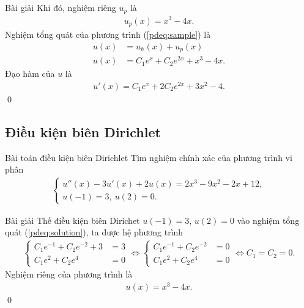 \documentclass[9pt]{beamer}
\numberwithin{equation}{section}
\begin{document}
\begin{frame}
\begin{exampleblock}{Bài giải}
     Khi đó, nghiệm riêng $u_p$ là
    \begin{align*}
        u_p(x) = x^3 - 4x.
    \end{align*}
    Nghiệm tổng quát của phương trình (\ref{pdeq:sample}) là
    \begin{align}
        u(x) &= u_h(x) + u_p(x) \nonumber \\
        u(x) &= C_1 e^x + C_2 e^{2x} + x^3 - 4x. \label{pdeq:solution}
    \end{align}
    Đạo hàm của $u$ là
    \begin{align}
        u'(x) = C_1 e^x + 2C_2 e^{2x} + 3x^2 - 4. \label{pdeq:deri}
    \end{align} \hfill \qed
\end{exampleblock}
\end{frame}

\subsection{Điều kiện biên Dirichlet}

\begin{frame}
\begin{block}{Bài toán điều kiện biên Dirichlet}
    Tìm nghiệm chính xác của phương trình vi phân
    \begin{align*}
        \begin{cases}
        u''(x) - 3u'(x) + 2u(x) = 2x^3 - 9x^2 - 2x + 12, \\
        u(-1) = 3, \ u(2) = 0.
        \end{cases}
    \end{align*}
\end{block}
\begin{exampleblock}{Bài giải}
    Thế điều kiện biên Dirichet $u(-1) = 3$, $u(2) = 0$ vào nghiệm tổng quát (\ref{pdeq:solution}), ta được hệ phương trình
    \begin{align*}
        \begin{cases}
        C_1 e^{-1} + C_2 e^{-2} + 3 &= 3 \\
        C_1 e^2 + C_2 e^4 &= 0
        \end{cases} \Leftrightarrow
        \begin{cases}
        C_1 e^{-1} + C_2 e^{-2} &= 0 \\
        C_1 e^2 + C_2 e^4 &= 0
        \end{cases} \Leftrightarrow
    C_1 = C_2 = 0.
    \end{align*}
    Nghiệm riêng của phương trình là
    \begin{align*}
        u(x) = x^3 - 4x.
    \end{align*} \hfill \qed
\end{exampleblock}
\end{frame}
\end{document}
